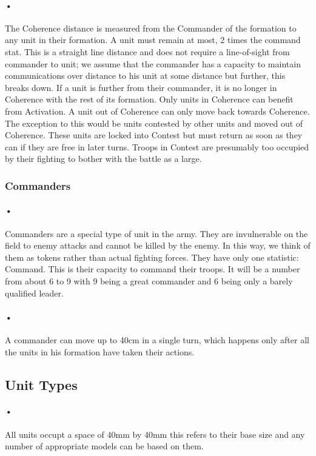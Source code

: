 \documentclass[12pt]{article}
\begin{document}
\paragraph{•}
The Coherence distance is measured from the Commander of the formation to any unit in their formation. A unit must remain at most, 2 times the command stat. This is a straight line distance and does not require a line-of-sight from commander to unit; we assume that the commander has a capacity to maintain communications over distance to his unit at some distance but further, this breaks down. If a unit is further from their commander, it is no longer in Coherence with the rest of its formation. Only units in Coherence can benefit from Activation. A unit out of Coherence can only move back towards Coherence. The exception to this would be units contested by other units and moved out of Coherence. These units are locked into Contest but must return as soon as they can if they are free in later turns. Troops in Contest are presumably too occupied by their fighting to bother with the battle as a large.

\subsubsection{Commanders}
\paragraph{•}
Commanders are a special type of unit in the army. They are invulnerable on the field to enemy attacks and cannot be killed by the enemy. In this way, we think of them as tokens rather than actual fighting forces. They have only one statistic: Command. This is their capacity to command their troops. It will be a number from about 6 to 9 with 9 being a great commander and 6 being only a barely qualified leader.
\paragraph{•}
A commander can move up to 40cm in a single turn, which happens only after all the units in his formation have taken their actions.

\subsection{Unit Types}
\paragraph{•}
All units occupt a space of 40mm by 40mm this refers to their base size and any number of appropriate models can be based on them.
\end{document}
